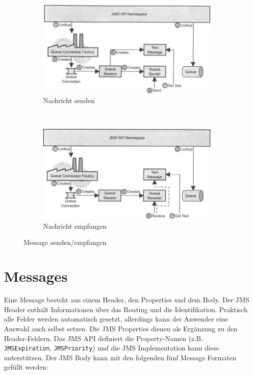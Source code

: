 \begin{figure}
	\centering
	\begin{subfigure}[b]{0.48\textwidth}
		\includegraphics[width=\textwidth]{fig/send-message}
		\caption{Nachricht senden}
	\end{subfigure}
	~
	\begin{subfigure}[b]{0.48\textwidth}
		\includegraphics[width=\textwidth]{fig/receive-message}
		\caption{Nachricht empfangen}
	\end{subfigure}
	\caption{Message senden/empfangen}
	\label{fig:send-receive-message}
\end{figure} 


\section{Messages}

Eine Message besteht aus einem Header, den Properties und dem Body. Der JMS Header enthält Informationen über das Routing und die Identifikation. Praktisch alle Felder werden automatisch gesetzt, allerdings kann der Anwender eine Auswahl auch selbst setzen. Die JMS Properties dienen als Ergänzung zu den Header-Feldern. Das JMS API definiert die Property-Namen (z.B. \verb|JMSExpiration|, \verb|JMSPriority|) und die JMS Implementation kann diese unterstützen. Der JMS Body kann mit den folgenden fünf Message Formaten gefüllt werden:


